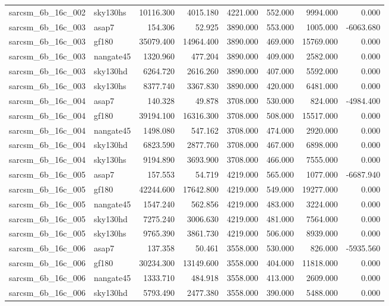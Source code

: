 \begin{tabular}{llrrrrrr}
sarcsm\_6b\_16c\_002 & sky130hs & 10116.300 & 4015.180 & 4221.000 & 552.000 & 9994.000 & 0.000 \\
sarcsm\_6b\_16c\_003 & asap7 & 154.306 & 52.925 & 3890.000 & 553.000 & 1005.000 & -6063.680 \\
sarcsm\_6b\_16c\_003 & gf180 & 35079.400 & 14964.400 & 3890.000 & 469.000 & 15769.000 & 0.000 \\
sarcsm\_6b\_16c\_003 & nangate45 & 1320.960 & 477.204 & 3890.000 & 409.000 & 2582.000 & 0.000 \\
sarcsm\_6b\_16c\_003 & sky130hd & 6264.720 & 2616.260 & 3890.000 & 407.000 & 5592.000 & 0.000 \\
sarcsm\_6b\_16c\_003 & sky130hs & 8377.740 & 3367.830 & 3890.000 & 420.000 & 6481.000 & 0.000 \\
sarcsm\_6b\_16c\_004 & asap7 & 140.328 & 49.878 & 3708.000 & 530.000 & 824.000 & -4984.400 \\
sarcsm\_6b\_16c\_004 & gf180 & 39194.100 & 16316.300 & 3708.000 & 508.000 & 15517.000 & 0.000 \\
sarcsm\_6b\_16c\_004 & nangate45 & 1498.080 & 547.162 & 3708.000 & 474.000 & 2920.000 & 0.000 \\
sarcsm\_6b\_16c\_004 & sky130hd & 6823.590 & 2877.760 & 3708.000 & 467.000 & 6898.000 & 0.000 \\
sarcsm\_6b\_16c\_004 & sky130hs & 9194.890 & 3693.900 & 3708.000 & 466.000 & 7555.000 & 0.000 \\
sarcsm\_6b\_16c\_005 & asap7 & 157.553 & 54.719 & 4219.000 & 565.000 & 1077.000 & -6687.940 \\
sarcsm\_6b\_16c\_005 & gf180 & 42244.600 & 17642.800 & 4219.000 & 549.000 & 19277.000 & 0.000 \\
sarcsm\_6b\_16c\_005 & nangate45 & 1547.240 & 562.856 & 4219.000 & 483.000 & 3224.000 & 0.000 \\
sarcsm\_6b\_16c\_005 & sky130hd & 7275.240 & 3006.630 & 4219.000 & 481.000 & 7564.000 & 0.000 \\
sarcsm\_6b\_16c\_005 & sky130hs & 9765.390 & 3861.730 & 4219.000 & 506.000 & 8939.000 & 0.000 \\
sarcsm\_6b\_16c\_006 & asap7 & 137.358 & 50.461 & 3558.000 & 530.000 & 826.000 & -5935.560 \\
sarcsm\_6b\_16c\_006 & gf180 & 30234.300 & 13149.600 & 3558.000 & 404.000 & 11818.000 & 0.000 \\
sarcsm\_6b\_16c\_006 & nangate45 & 1333.710 & 484.918 & 3558.000 & 413.000 & 2609.000 & 0.000 \\
sarcsm\_6b\_16c\_006 & sky130hd & 5793.490 & 2477.380 & 3558.000 & 390.000 & 5488.000 & 0.000 \\

\end{tabular}
